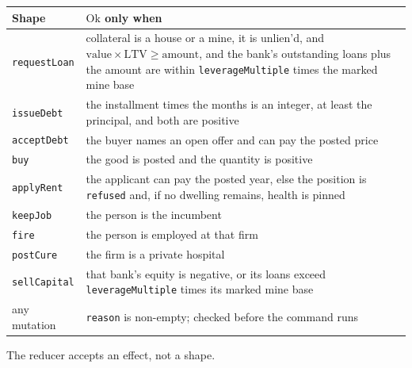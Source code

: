 \documentclass[11pt]{article}
\begin{document}
\begin{center}
\small
\begin{tabular}{@{}lp{8.6cm}@{}}
\toprule
Shape & $\mathrm{Ok}$ only when \\
\midrule
\texttt{requestLoan} &
collateral is a house or a mine, it is unlien'd, and
$\mathrm{value} \times \mathrm{LTV} \ge \mathrm{amount}$, and the
bank's outstanding loans plus the amount are within
\texttt{leverageMultiple} times the marked mine base \\
\texttt{issueDebt} &
the installment times the months is an integer, at least the
principal, and both are positive \\
\texttt{acceptDebt} &
the buyer names an open offer and can pay the posted price \\
\texttt{buy} &
the good is posted and the quantity is positive \\
\texttt{applyRent} &
the applicant can pay the posted year, else the position is
\texttt{refused} and, if no dwelling remains, health is pinned \\
\texttt{keepJob} &
the person is the incumbent \\
\texttt{fire} &
the person is employed at that firm \\
\texttt{postCure} &
the firm is a private hospital \\
\texttt{sellCapital} &
that bank's equity is negative, or its loans exceed
\texttt{leverageMultiple} times its marked mine base \\
any mutation &
\texttt{reason} is non-empty; checked before the command runs \\
\bottomrule
\end{tabular}
\end{center}

The reducer accepts an effect, not a shape.
\end{document}
